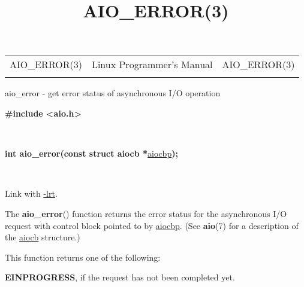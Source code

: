 \documentclass[]{article}
\title{AIO\_ERROR(3)}
\author{}
\date{}
\let\realtextbf=\textbf
\renewcommand{\textbf}[1]{\textcolor{boldcolor}{\realtextbf{#1}}}
\renewcommand{\emph}[1]{\underline{#1}}
\begin{document}
\maketitle

\begin{longtable}[c]{@{}lll@{}}
\toprule\addlinespace
AIO\_ERROR(3) & Linux Programmer's Manual & AIO\_ERROR(3)
\\\addlinespace
\bottomrule
\end{longtable}


aio\_error - get error status of asynchronous I/O operation


\textbf{\#include \textless{}aio.h\textgreater{}}

~

\textbf{int aio\_error(const struct aiocb *}\emph{aiocbp}\textbf{);}

~

Link with \emph{-lrt}.


The \textbf{aio\_error}() function returns the error status for the
asynchronous I/O request with control block pointed to by \emph{aiocbp}.
(See \textbf{aio}(7) for a description of the \emph{aiocb} structure.)


This function returns one of the following:

\begin{description}
\itemsep1pt\parskip0pt
\item[*]
\textbf{EINPROGRESS}, if the request has not been completed yet.
\end{description}
\end{document}
